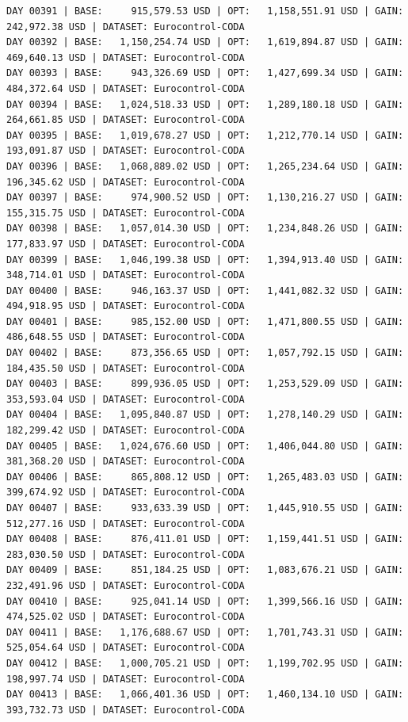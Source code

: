 \documentclass[11pt,a4paper]{article}
\begin{document}
\begin{verbatim}
DAY 00391 | BASE:     915,579.53 USD | OPT:   1,158,551.91 USD | GAIN: 242,972.38 USD | DATASET: Eurocontrol-CODA
DAY 00392 | BASE:   1,150,254.74 USD | OPT:   1,619,894.87 USD | GAIN: 469,640.13 USD | DATASET: Eurocontrol-CODA
DAY 00393 | BASE:     943,326.69 USD | OPT:   1,427,699.34 USD | GAIN: 484,372.64 USD | DATASET: Eurocontrol-CODA
DAY 00394 | BASE:   1,024,518.33 USD | OPT:   1,289,180.18 USD | GAIN: 264,661.85 USD | DATASET: Eurocontrol-CODA
DAY 00395 | BASE:   1,019,678.27 USD | OPT:   1,212,770.14 USD | GAIN: 193,091.87 USD | DATASET: Eurocontrol-CODA
DAY 00396 | BASE:   1,068,889.02 USD | OPT:   1,265,234.64 USD | GAIN: 196,345.62 USD | DATASET: Eurocontrol-CODA
DAY 00397 | BASE:     974,900.52 USD | OPT:   1,130,216.27 USD | GAIN: 155,315.75 USD | DATASET: Eurocontrol-CODA
DAY 00398 | BASE:   1,057,014.30 USD | OPT:   1,234,848.26 USD | GAIN: 177,833.97 USD | DATASET: Eurocontrol-CODA
DAY 00399 | BASE:   1,046,199.38 USD | OPT:   1,394,913.40 USD | GAIN: 348,714.01 USD | DATASET: Eurocontrol-CODA
DAY 00400 | BASE:     946,163.37 USD | OPT:   1,441,082.32 USD | GAIN: 494,918.95 USD | DATASET: Eurocontrol-CODA
DAY 00401 | BASE:     985,152.00 USD | OPT:   1,471,800.55 USD | GAIN: 486,648.55 USD | DATASET: Eurocontrol-CODA
DAY 00402 | BASE:     873,356.65 USD | OPT:   1,057,792.15 USD | GAIN: 184,435.50 USD | DATASET: Eurocontrol-CODA
DAY 00403 | BASE:     899,936.05 USD | OPT:   1,253,529.09 USD | GAIN: 353,593.04 USD | DATASET: Eurocontrol-CODA
DAY 00404 | BASE:   1,095,840.87 USD | OPT:   1,278,140.29 USD | GAIN: 182,299.42 USD | DATASET: Eurocontrol-CODA
DAY 00405 | BASE:   1,024,676.60 USD | OPT:   1,406,044.80 USD | GAIN: 381,368.20 USD | DATASET: Eurocontrol-CODA
DAY 00406 | BASE:     865,808.12 USD | OPT:   1,265,483.03 USD | GAIN: 399,674.92 USD | DATASET: Eurocontrol-CODA
DAY 00407 | BASE:     933,633.39 USD | OPT:   1,445,910.55 USD | GAIN: 512,277.16 USD | DATASET: Eurocontrol-CODA
DAY 00408 | BASE:     876,411.01 USD | OPT:   1,159,441.51 USD | GAIN: 283,030.50 USD | DATASET: Eurocontrol-CODA
DAY 00409 | BASE:     851,184.25 USD | OPT:   1,083,676.21 USD | GAIN: 232,491.96 USD | DATASET: Eurocontrol-CODA
DAY 00410 | BASE:     925,041.14 USD | OPT:   1,399,566.16 USD | GAIN: 474,525.02 USD | DATASET: Eurocontrol-CODA
DAY 00411 | BASE:   1,176,688.67 USD | OPT:   1,701,743.31 USD | GAIN: 525,054.64 USD | DATASET: Eurocontrol-CODA
DAY 00412 | BASE:   1,000,705.21 USD | OPT:   1,199,702.95 USD | GAIN: 198,997.74 USD | DATASET: Eurocontrol-CODA
DAY 00413 | BASE:   1,066,401.36 USD | OPT:   1,460,134.10 USD | GAIN: 393,732.73 USD | DATASET: Eurocontrol-CODA

\end{verbatim}
\end{document}
